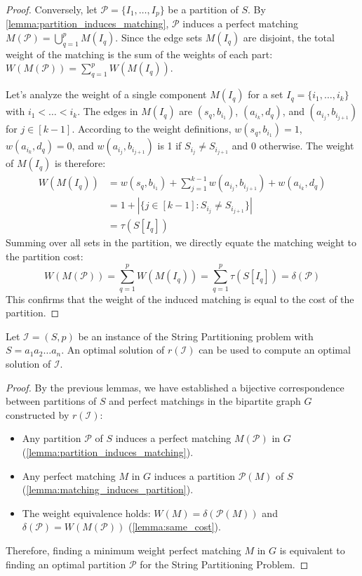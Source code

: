 \begin{proof}
    Conversely, let $\mathcal{P} = \{I_1, \ldots, I_p\}$ be a partition of $S$. By \cref{lemma:partition_induces_matching}, $\mathcal{P}$ induces a perfect matching $M(\mathcal{P}) = \bigcup_{q=1}^p M(I_q)$. Since the edge sets $M(I_q)$ are disjoint, the total weight of the matching is the sum of the weights of each part: $W(M(\mathcal{P})) = \sum_{q=1}^p W(M(I_q))$.

    Let's analyze the weight of a single component $M(I_q)$ for a set $I_q = \{i_1, \dots, i_k\}$ with $i_1 < \dots < i_k$. The edges in $M(I_q)$ are $(s_q, b_{i_1})$, $(a_{i_k}, d_q)$, and $(a_{i_j}, b_{i_{j+1}})$ for $j \in [k-1]$. According to the weight definitions, $w(s_q, b_{i_1})=1$, $w(a_{i_k}, d_q)=0$, and $w(a_{i_j}, b_{i_{j+1}})$ is 1 if $S_{i_j} \neq S_{i_{j+1}}$ and 0 otherwise. The weight of $M(I_q)$ is therefore:
    \begin{align*}
        W(M(I_q)) &= w(s_q, b_{i_1}) + \sum_{j=1}^{k-1} w(a_{i_j}, b_{i_{j+1}}) + w(a_{i_k}, d_q) \\
                  &= 1 + |\{j \in [k-1] : S_{i_j} \neq S_{i_{j+1}}\}| \\
                  &= \tau(S[I_q])
    \end{align*}
    Summing over all sets in the partition, we directly equate the matching weight to the partition cost:
    $$
        W(M(\mathcal{P})) = \sum_{q=1}^p W(M(I_q)) = \sum_{q=1}^p \tau(S[I_q]) = \delta(\mathcal{P})
    $$
    This confirms that the weight of the induced matching is equal to the cost of the partition.
\end{proof}

\begin{theorem}
    Let $\mathcal{I}=(S,p)$ be an instance of the String Partitioning problem with $S=a_1a_2\dots a_n$. An optimal solution of $r(\mathcal{I})$ can be used to compute an optimal solution of $\mathcal{I}$.
\end{theorem}
\begin{proof}
    By the previous lemmas, we have established a bijective correspondence between partitions of $S$ and perfect matchings in the bipartite graph $G$ constructed by $r(\mathcal{I})$:
    \begin{itemize}
        \item Any partition $\mathcal{P}$ of $S$ induces a perfect matching $M(\mathcal{P})$ in $G$ (\cref{lemma:partition_induces_matching}).
        \item Any perfect matching $M$ in $G$ induces a partition $\mathcal{P}(M)$ of $S$ (\cref{lemma:matching_induces_partition}).
        \item The weight equivalence holds: $W(M) = \delta(\mathcal{P}(M))$ and $\delta(\mathcal{P}) = W(M(\mathcal{P}))$ (\cref{lemma:same_cost}).
    \end{itemize}
    
    Therefore, finding a minimum weight perfect matching $M$ in $G$ is equivalent to finding an optimal partition $\mathcal{P}$ for the String Partitioning Problem.
\end{proof}

